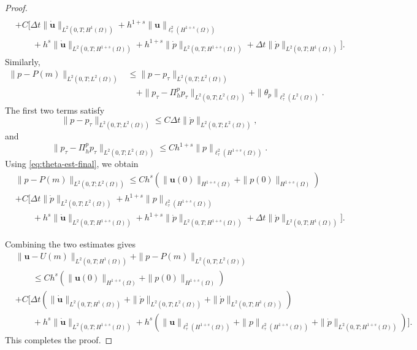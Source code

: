 \documentclass{amsart}
\begin{document}
\begin{proof}
\[\begin{aligned}
\\
&+C\Big[
\Delta t
\|\dot{\boldsymbol u}\|_{L^2(0,T;H^1(\Omega))}
+
h^{1+s}
\|\boldsymbol u\|_{\ell_\tau^2(H^{1+s}(\Omega))}
\\
&\qquad +
h^s
\|\dot{\boldsymbol u}\|_{L^2(0,T;H^{1+s}(\Omega))}
+
h^{1+s}
\|\dot p\|_{L^2(0,T;H^{1+s}(\Omega))}
+
\Delta t
\|\dot p\|_{L^2(0,T;H^1(\Omega))}
\Big].
\end{aligned}
\]
%
Similarly,
\[
\begin{aligned}
\|p-P(m)\|_{L^2(0,T;L^2(\Omega))}
&\le
\|p-p_\tau\|_{L^2(0,T;L^2(\Omega))}
\\
&\quad
+
\|p_\tau-\Pi_h^p p_\tau\|_{L^2(0,T;L^2(\Omega))}
+
\|\theta_p\|_{\ell_\tau^2(L^2(\Omega))}.
\end{aligned}
\]
The first two terms satisfy
\[
        \|p-p_\tau\|_{L^2(0,T;L^2(\Omega))}
        \le
        C\Delta t
        \|\dot p\|_{L^2(0,T;L^2(\Omega))},
\]
and
\[
        \|p_\tau-\Pi_h^p p_\tau\|_{L^2(0,T;L^2(\Omega))}
        \le
        C h^{1+s}
        \|p\|_{\ell_\tau^2(H^{1+s}(\Omega))}.
\]
Using \eqref{eq:theta-est-final}, we obtain
\[
\begin{aligned}
&\|p-P(m)\|_{L^2(0,T;L^2(\Omega))}
\le  Ch^{s} (\|\boldsymbol{u}(0)\|_{H^{1+s}(\Omega)} + \|p(0)\|_{H^{1+{s}}(\Omega)} )
\\
&+C\Big[
\Delta t
\|\dot p\|_{L^2(0,T;L^2(\Omega))}
+
h^{1+s}
\|p\|_{\ell_\tau^2(H^{1+s}(\Omega))}
\\
&\qquad +
h^s
\|\dot{\boldsymbol u}\|_{L^2(0,T;H^{1+s}(\Omega))}
+
h^{1+s}
\|\dot p\|_{L^2(0,T;H^{1+s}(\Omega))}
+
\Delta t
\|\dot p\|_{L^2(0,T;H^1(\Omega))}
\Big].
\end{aligned}
\]

Combining the two estimates gives
\[
\begin{aligned}
&\|\boldsymbol u-U(m)\|_{L^2(0,T;H^1(\Omega))}
+
\|p-P(m)\|_{L^2(0,T;L^2(\Omega))}
\\
&\qquad
\le Ch^{s} (\|\boldsymbol{u}(0)\|_{H^{1+s}(\Omega)} + \|p(0)\|_{H^{1+{s}}(\Omega)} )
\\
&
+ C\Big[
\Delta t
\left(
\|\dot{\boldsymbol u}\|_{L^2(0,T;H^1(\Omega))}
+
\|\dot p\|_{L^2(0,T;L^2(\Omega))}
+
\|\dot p\|_{L^2(0,T;H^1(\Omega))}
\right)
\\
&\qquad
+
h^s
\|\dot{\boldsymbol u}\|_{L^2(0,T;H^{1+s}(\Omega))}
+
h^{s}
\left(
\|\boldsymbol u\|_{\ell_\tau^2(H^{1+s}(\Omega))}
+
\|p\|_{\ell_\tau^2(H^{1+s}(\Omega))}
+
\|\dot p\|_{L^2(0,T;H^{1+s}(\Omega))}
\right)
\Big].
\end{aligned}
\]
This completes the proof.
\end{proof}
\end{document}

